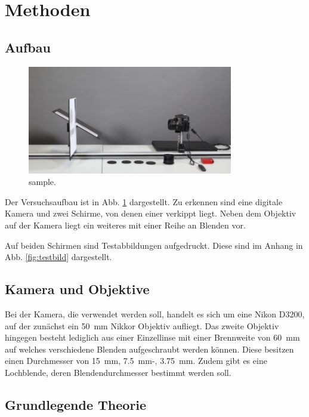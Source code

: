 \section{Methoden} \label{sec:Methoden}
	
	\subsection{Aufbau}	
		
		\begin{figure}[ht]
			\centering
			\includegraphics[width=0.8\textwidth]{bilder/aufbau.png}
			\caption{sample.\cite{WWU}} %
			\label{fig:aufbau}	
		\end{figure}	
		Der Versuchsaufbau ist in Abb. \ref{fig:aufbau} dargestellt.
		Zu erkennen sind eine digitale Kamera und zwei Schirme, von denen einer verkippt liegt.
		Neben dem Objektiv auf der Kamera liegt ein weiteres mit einer Reihe an Blenden vor.
		
		Auf beiden Schirmen sind Testabbildungen aufgedruckt.
		Diese sind im Anhang in Abb. \ref{fig:testbild} dargestellt.
		
	\subsection{Kamera und Objektive}
	 
	 	Bei der Kamera, die verwendet werden soll, handelt es sich um eine Nikon D3200, auf der zunächst ein \SI{50}{\milli\meter} Nikkor Objektiv aufliegt.
		Das zweite Objektiv hingegen besteht lediglich aus einer Einzellinse mit einer Brennweite von \SI{60}{\milli\meter} auf welches verschiedene Blenden aufgeschraubt werden können.
		Diese besitzen einen Durchmesser von \SI{15}{\milli\meter}, \SI{7,5}{\milli\meter}-, \SI{3,75}{\milli\meter}.
		Zudem gibt es eine Lochblende, deren Blendendurchmesser bestimmt werden soll.
		
	\subsection{Grundlegende Theorie} \label{subsec:Theorie} %
		
